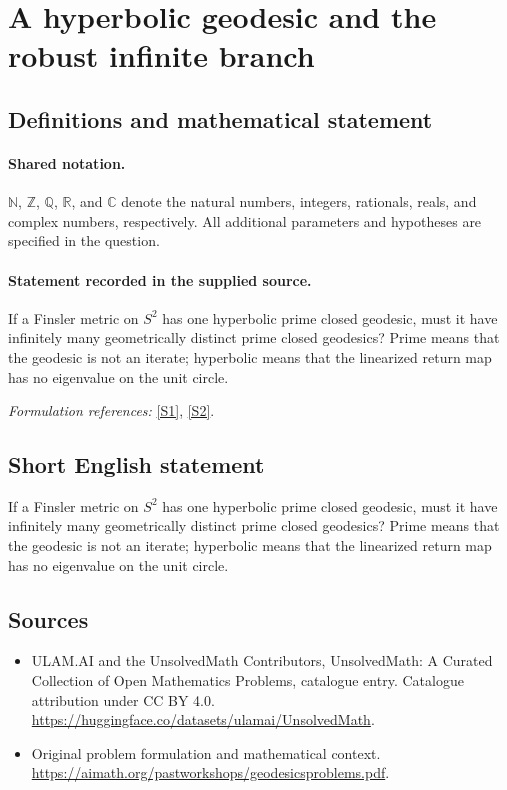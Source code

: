 \documentclass[11pt]{article}
\newcommand{\sref}[2]{\hyperlink{source:#1:#2}{[S#2]}}
\begin{document}
\section{A hyperbolic geodesic and the robust infinite branch}\label{statement}

\subsection{Definitions and mathematical statement}

\paragraph{Shared notation.}$\mathbb N$, $\mathbb Z$, $\mathbb Q$, $\mathbb R$, and $\mathbb C$ denote the natural numbers, integers, rationals, reals, and complex numbers, respectively. All additional parameters and hypotheses are specified in the question.


\paragraph{Statement recorded in the supplied source.}
If a Finsler metric on $S^2$ has one hyperbolic prime closed geodesic, must it have infinitely many geometrically distinct prime closed geodesics? Prime means that the geodesic is not an iterate; hyperbolic means that the linearized return map has no eigenvalue on the unit circle.
\par\smallskip\textit{Formulation references:} \sref{statement}{1}, \sref{statement}{2}.
\subsection{Short English statement}
If a Finsler metric on $S^2$ has one hyperbolic prime closed geodesic, must it have infinitely many geometrically distinct prime closed geodesics? Prime means that the geodesic is not an iterate; hyperbolic means that the linearized return map has no eigenvalue on the unit circle.
\subsection{Sources}
\begin{itemize}
\item[\hypertarget{source:statement:1}{S1}] ULAM.AI and the UnsolvedMath Contributors, UnsolvedMath: A Curated Collection of Open Mathematics Problems, catalogue entry. Catalogue attribution under CC BY 4.0.
\url{https://huggingface.co/datasets/ulamai/UnsolvedMath}.
\item[\hypertarget{source:statement:2}{S2}] Original problem formulation and mathematical context.
\url{https://aimath.org/pastworkshops/geodesicsproblems.pdf}.
\end{itemize}
\label{end:statement}
\end{document}
